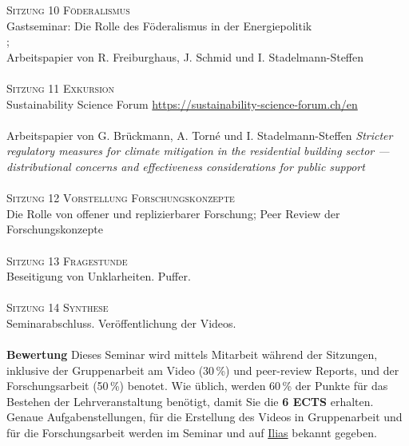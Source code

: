 \documentclass[12pt,a4paper]{article}
\begin{document}
\textsc{Sitzung 10 \dotfill Föderalismus} \smallskip \\ 
{\color{darkgreen}{\Rectangle}} Gastseminar: Die Rolle des Föderalismus in der Energiepolitik\\
{\color{darkgreen}{\Rectangle}} ; \\ {\color{darkgreen}{\Rectangle}} Arbeitspapier von R. Freiburghaus, J. Schmid und I. Stadelmann-Steffen\\
\medskip  \\	
\clearpage
\textsc{Sitzung 11 \dotfill Exkursion} \smallskip \\ 
{\color{darkgreen}{\Rectangle}} Sustainability Science Forum \url{https://sustainability-science-forum.ch/en} \\
{\color{darkgreen}{\Rectangle}}  \\
{\color{darkgreen}{\Rectangle}} Arbeitspapier von G. Brückmann, A. Torné und I. Stadelmann-Steffen \textit{Stricter regulatory measures for climate mitigation in the residential building sector — distributional concerns and effectiveness considerations for public support}\\
\medskip  \\	

\textsc{Sitzung 12 \dotfill Vorstellung Forschungskonzepte} \smallskip \\ 
{\color{darkgreen}{\Rectangle}} Die Rolle von offener und replizierbarer Forschung; Peer Review der Forschungskonzepte\\
\medskip  \\	


\textsc{Sitzung 13 \dotfill Fragestunde} \smallskip \\ 
{\color{darkgreen}{\Rectangle}} Beseitigung von Unklarheiten. Puffer. \\  \medskip  \\	

\textsc{Sitzung 14 \dotfill Synthese}  \smallskip \\ 
{\color{darkgreen}{\Rectangle}} Seminarabschluss. Veröffentlichung der Videos.\\
\medskip  \\	


\noindent\textbf{Bewertung}
Dieses Seminar wird mittels Mitarbeit während der Sitzungen, inklusive der Gruppenarbeit am Video (30\,\%) und peer-review Reports, und der Forschungsarbeit (50\,\%) benotet. Wie üblich, werden 60\,\% der Punkte für das Bestehen der Lehrveranstaltung benötigt, damit Sie die \textbf{6 ECTS} erhalten.\\
Genaue Aufgabenstellungen, für die Erstellung des Videos in Gruppenarbeit und für die Forschungsarbeit werden im Seminar und auf \href{https://ilias.unibe.ch/goto_ilias3_unibe_crs_3414477.html}{Ilias} bekannt gegeben.\\ 
\end{document}
